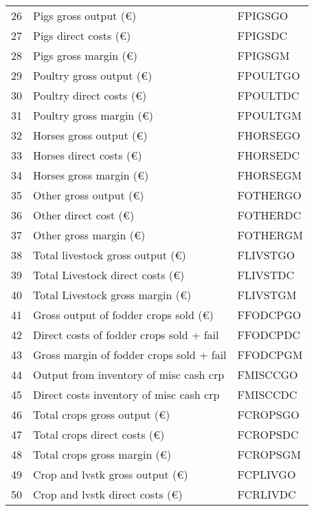 \documentclass{article}\usepackage{graphicx, color}
\begin{document}
\begin{flushleft}
\begin{table}[ht]
\begin{center}
\begin{tabular}{rll}
  26 & Pigs     gross output    (€) & FPIGSGO \\ 
  27 & Pigs     direct costs    (€) & FPIGSDC \\ 
  28 & Pigs     gross margin    (€) & FPIGSGM \\ 
  29 & Poultry  gross output    (€) & FPOULTGO \\ 
  30 & Poultry  direct costs    (€) & FPOULTDC \\ 
  31 & Poultry  gross margin    (€) & FPOULTGM \\ 
  32 & Horses   gross output    (€) & FHORSEGO \\ 
  33 & Horses   direct costs    (€) & FHORSEDC \\ 
  34 & Horses   gross margin    (€) & FHORSEGM \\ 
  35 & Other    gross output    (€) & FOTHERGO \\ 
  36 & Other    direct cost     (€) & FOTHERDC \\ 
  37 & Other    gross margin    (€) & FOTHERGM \\ 
  38 & Total livestock  gross output  (€) & FLIVSTGO \\ 
  39 & Total Livestock  direct costs  (€) & FLIVSTDC \\ 
  40 & Total Livestock  gross margin  (€) & FLIVSTGM \\ 
  41 & Gross output of fodder crops sold (€) & FFODCPGO \\ 
  42 & Direct costs of fodder crops sold + fail & FFODCPDC \\ 
  43 & Gross margin of fodder crops sold + fail & FFODCPGM \\ 
  44 & Output from inventory of misc cash crp & FMISCCGO \\ 
  45 & Direct costs inventory of misc cash crp & FMISCCDC \\ 
  46 & Total crops      gross output  (€) & FCROPSGO \\ 
  47 & Total crops      direct costs  (€) & FCROPSDC \\ 
  48 & Total crops      gross margin  (€) & FCROPSGM \\ 
  49 & Crop and lvstk   gross output  (€) & FCPLIVGO \\ 
  50 & Crop and lvstk   direct costs  (€) & FCRLIVDC \\ 
   \hline
\end{tabular}
\end{center}
\end{table}



\end{flushleft}
\end{document}

